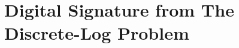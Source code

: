 \begin{comment}
Reduce $\mathcal{C}$ for $\Pi_H$ to $\mathcal{A}'$. $\Pr[\mathsf{coll}] = \Pr[\mathsf{Hashcoll}_{\mathcal{C},\Pi_H}(n)=1]$. \\
Reduce $\mathcal{A}$ for $\Pi$ to $\mathcal{A}'$.
$\Pr[\mathsf{SF} \land \overline{\mathsf{coll}}] = \Pr[\mathsf{Sigforge}_{\mathcal{A},\Pi}(n)=1]$.\\
So both $\Pr[\mathsf{coll}]$ and $\Pr[\mathsf{SF} \land \overline{\mathsf{coll}}]$ are negligible.
\end{proof}
\end{frame}
\begin{frame}\frametitle{Proof (Cont.)}
Reduce $\mathcal{C}$ for $\Pi_H$ to $\mathcal{A}'$. $\mathcal{A}'$ queries the signature $\sigma_i$ of $i$-th message $m_i$, $i = 1,\dotsc,\abs{\mathcal{Q}}$.
\begin{figure}
\begin{center}

\end{center}
\end{figure}
$\Pr[\mathsf{coll}] = \Pr[\mathsf{Hashcoll}_{\mathcal{C},\Pi_H}(n)=1]$.
\end{frame}
\begin{frame}\frametitle{Proof (Cont.)}
Reduce $\mathcal{A}$ for $\Pi$ to $\mathcal{A}'$.
\begin{figure}
\begin{center}

\end{center}
\end{figure}
$\Pr[\mathsf{SF} \land \overline{\mathsf{coll}}] = \Pr[\mathsf{Sigforge}_{\mathcal{A},\Pi}(n)=1]$.
\end{frame}
\end{comment}

\section{Digital Signature from The Discrete-Log Problem}


